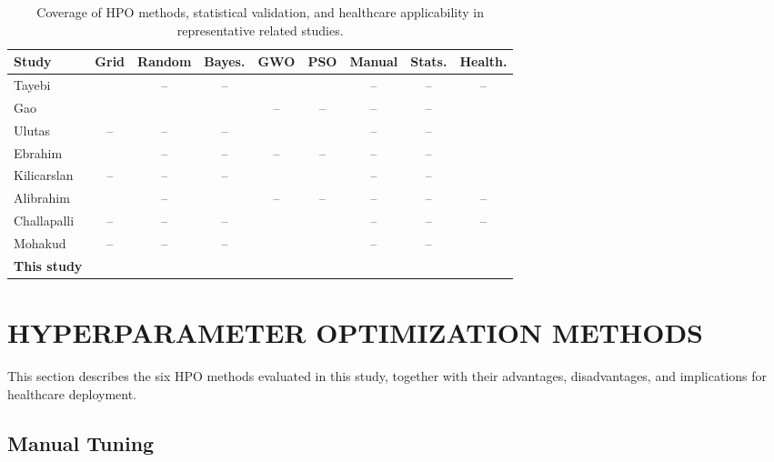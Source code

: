\documentclass[letterpaper, 10 pt, conference]{ieeeconf}
\begin{document}
\begin{table}[t]
	\caption{Coverage of HPO methods, statistical validation, and healthcare applicability in representative related studies.}
	\label{tab:related_work}
	\centering
	\scriptsize
	\begin{tabular}{|p{2.5cm}|c|c|c|c|c|c|c|c|}
		\hline
		\textbf{Study} & \textbf{Grid} & \textbf{Random} & \textbf{Bayes.} & \textbf{GWO} & \textbf{PSO} & \textbf{Manual} & \textbf{Stats.} & \textbf{Health.} \\
		\hline
		Tayebi~\cite{tayebi2022} & \checkmark & -- & -- & \checkmark & \checkmark & -- & -- & -- \\
		Gao~\cite{gao2020} & \checkmark & \checkmark & \checkmark & -- & -- & -- & -- & \checkmark \\
		Ulutas~\cite{ulutas2024} & -- & -- & -- & \checkmark & \checkmark & -- & -- & \checkmark \\
		Ebrahim~\cite{ebrahim2024} & \checkmark & -- & -- & -- & -- & -- & -- & \checkmark \\
		Kilicarslan~\cite{kilicarslan2023} & -- & -- & -- & \checkmark & \checkmark & -- & -- & \checkmark \\
		Alibrahim~\cite{alibrahim2021} & \checkmark & -- & \checkmark & -- & -- & -- & -- & -- \\
		Challapalli~\cite{challapalli2022} & -- & -- & -- & \checkmark & \checkmark & -- & -- & -- \\
		Mohakud~\cite{mohakud2022} & -- & -- & -- & \checkmark & \checkmark & -- & -- & \checkmark \\
		\hline
		\textbf{This study} & \checkmark & \checkmark & \checkmark & \checkmark & \checkmark & \checkmark & \checkmark & \checkmark \\
		\hline
	\end{tabular}
\end{table}

\section{HYPERPARAMETER OPTIMIZATION METHODS}
\label{sec:hpo}

This section describes the six HPO methods evaluated in this study, together with their advantages, disadvantages, and implications for healthcare deployment.

\subsection{Manual Tuning}
\end{document}
